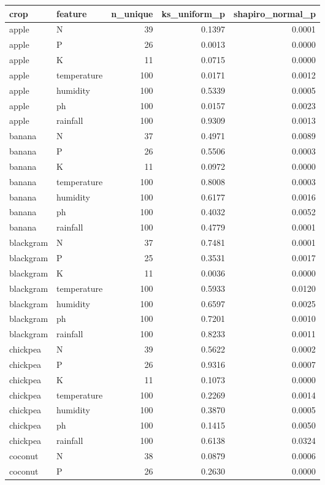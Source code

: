 \begin{tabular}{llrrr}
\toprule
crop & feature & n_unique & ks_uniform_p & shapiro_normal_p \\
\midrule
apple & N & 39 & 0.1397 & 0.0001 \\
apple & P & 26 & 0.0013 & 0.0000 \\
apple & K & 11 & 0.0715 & 0.0000 \\
apple & temperature & 100 & 0.0171 & 0.0012 \\
apple & humidity & 100 & 0.5339 & 0.0005 \\
apple & ph & 100 & 0.0157 & 0.0023 \\
apple & rainfall & 100 & 0.9309 & 0.0013 \\
banana & N & 37 & 0.4971 & 0.0089 \\
banana & P & 26 & 0.5506 & 0.0003 \\
banana & K & 11 & 0.0972 & 0.0000 \\
banana & temperature & 100 & 0.8008 & 0.0003 \\
banana & humidity & 100 & 0.6177 & 0.0016 \\
banana & ph & 100 & 0.4032 & 0.0052 \\
banana & rainfall & 100 & 0.4779 & 0.0001 \\
blackgram & N & 37 & 0.7481 & 0.0001 \\
blackgram & P & 25 & 0.3531 & 0.0017 \\
blackgram & K & 11 & 0.0036 & 0.0000 \\
blackgram & temperature & 100 & 0.5933 & 0.0120 \\
blackgram & humidity & 100 & 0.6597 & 0.0025 \\
blackgram & ph & 100 & 0.7201 & 0.0010 \\
blackgram & rainfall & 100 & 0.8233 & 0.0011 \\
chickpea & N & 39 & 0.5622 & 0.0002 \\
chickpea & P & 26 & 0.9316 & 0.0007 \\
chickpea & K & 11 & 0.1073 & 0.0000 \\
chickpea & temperature & 100 & 0.2269 & 0.0014 \\
chickpea & humidity & 100 & 0.3870 & 0.0005 \\
chickpea & ph & 100 & 0.1415 & 0.0050 \\
chickpea & rainfall & 100 & 0.6138 & 0.0324 \\
coconut & N & 38 & 0.0879 & 0.0006 \\
coconut & P & 26 & 0.2630 & 0.0000 \\

\end{tabular}
